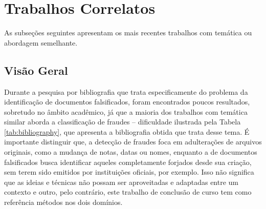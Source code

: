 \chapter{Trabalhos Correlatos}

As subseções seguintes apresentam os mais recentes trabalhos com temática ou abordagem semelhante.

\section{Visão Geral}

Durante a pesquisa por bibliografia que trata especificamente do problema da identificação de documentos falsificados, foram encontrados poucos resultados, sobretudo no âmbito acadêmico, já que a maioria dos trabalhos com temática similar aborda a classificação de fraudes -- dificuldade ilustrada pela Tabela \ref{tab:bibliography}, que apresenta a bibliografia obtida que trata desse tema. É importante distinguir que, a detecção de fraudes foca em adulterações de arquivos originais, como a mudança de notas, datas ou nomes, enquanto a de documentos falsificados busca identificar aqueles completamente forjados desde sua criação, sem terem sido emitidos por instituições oficiais, por exemplo. Isso não significa que as ideias e técnicas não possam ser aproveitadas e adaptadas entre um contexto e outro, pelo contrário, este trabalho de conclusão de curso tem como referência métodos nos dois domínios.

\begin{table}[H]
    \caption{Bibliografia Pesquisada com Temas Abordados}
    \label{tab:bibliography}
\end{table}

